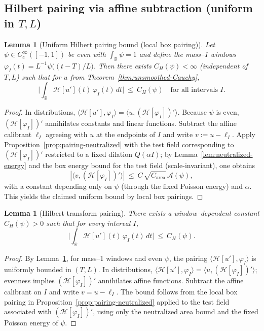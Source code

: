 \documentclass[11pt]{article}
\newtheorem{lemma}[theorem]{Lemma}
\theoremstyle{definition}
\theoremstyle{remark}
\newcommand{\R}{\mathbb{R}}
\begin{document}
\subsection*{Hilbert pairing via affine subtraction (uniform in $T,L$)}
\begin{lemma}[Uniform Hilbert pairing bound (local box pairing)]\label{lem:hilbert-H1BMO}
Let $\psi\in C_c^\infty([-1,1])$ be even with $\int_\R\psi=1$ and define the mass--1 windows $\varphi_I(t)=L^{-1}\psi\big((t-T)/L\big)$. Then there exists $C_H(\psi)<\infty$ (independent of $T,L$) such that for $u$ from Theorem~\ref{thm:unsmoothed-Cauchy},
\[
  \Big|\int_\R \mathcal H[u'](t)\,\varphi_I(t)\,dt\Big|\ \le\ C_H(\psi)\quad\text{for all intervals }I.
\]
\end{lemma}
\begin{proof}
In distributions, $\langle \mathcal H[u'],\varphi_I\rangle=\langle u,(\mathcal H[\varphi_I])'\rangle$. Because $\psi$ is even, $(\mathcal H[\varphi_I])'$ annihilates constants and linear functions. Subtract the affine calibrant $\ell_I$ agreeing with $u$ at the endpoints of $I$ and write $v:=u-\ell_I$. Apply Proposition~\ref{prop:pairing-neutralized} with the test field corresponding to $(\mathcal H[\varphi_I])'$ restricted to a fixed dilation $Q(\alpha I)$; by Lemma~\ref{lem:neutralized-energy} and the box energy bound for the test field (scale-invariant), one obtains
\[
  |\langle v,(\mathcal H[\varphi_I])'\rangle|\ \le\ C\,\sqrt{C_{\mathrm{area}}}\,\mathcal A(\psi),
\]
with a constant depending only on $\psi$ (through the fixed Poisson energy) and $\alpha$. This yields the claimed uniform bound by local box pairings.
\end{proof}
\begin{lemma}[Hilbert-transform pairing]\label{lem:hilbert}
There exists a window–dependent constant \(C_H(\psi)>0\) such that for every interval \(I\),
\[ \Big|\int_{\R} \mathcal H[u'](t)\,\varphi_I(t)\,dt\Big|\ \le\ C_H(\psi).\]
\end{lemma}
\begin{proof}
By Lemma~\ref{lem:hilbert-H1BMO}, for mass–1 windows and even \(\psi\), the pairing \(\langle \mathcal H[u'],\varphi_I\rangle\) is uniformly bounded in \((T,L)\). In distributions, \(\langle \mathcal H[u'],\varphi_I\rangle=\langle u,(\mathcal H[\varphi_I])'\rangle\); evenness implies \((\mathcal H[\varphi_I])'\) annihilates affine functions. Subtract the affine calibrant on \(I\) and write \(v=u-\ell_I\). The bound follows from the local box pairing in Proposition~\ref{prop:pairing-neutralized} applied to the test field associated with \((\mathcal H[\varphi_I])'\), using only the neutralized area bound and the fixed Poisson energy of \(\psi\).
\end{proof}
\end{document}
